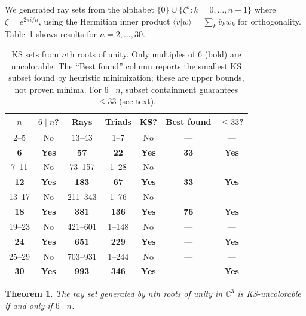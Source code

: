 \documentclass[12pt,a4paper]{article}
\newtheorem{theorem}{Theorem}
\newcommand{\C}{\mathbb{C}}
\newcommand{\braket}[2]{\langle#1|#2\rangle}
\begin{document}
We generated ray sets from the alphabet $\{0\} \cup \{\zeta^k : k = 0, \ldots, n-1\}$ where $\zeta = e^{2\pi i/n}$, using the Hermitian inner product $\braket{v}{w} = \sum_k \bar{v}_k w_k$ for orthogonality. Table~\ref{tab:roots} shows results for $n = 2, \ldots, 30$.

\begin{table}[ht]
\centering
\caption{KS sets from $n$th roots of unity. Only multiples of 6 (bold) are uncolorable. The ``Best found'' column reports the smallest KS subset found by heuristic minimization; these are upper bounds, not proven minima. For $6 \mid n$, subset containment guarantees $\leq 33$ (see text).}
\label{tab:roots}
\begin{tabular}{ccccccc}
\toprule
$n$ & $6 \mid n$? & Rays & Triads & KS? & Best found & $\leq 33$? \\
\midrule
2--5 & No & 13--43 & 1--7 & No & --- & --- \\
\textbf{6} & \textbf{Yes} & \textbf{57} & \textbf{22} & \textbf{Yes} & \textbf{33} & \textbf{Yes} \\
7--11 & No & 73--157 & 1--28 & No & --- & --- \\
\textbf{12} & \textbf{Yes} & \textbf{183} & \textbf{67} & \textbf{Yes} & \textbf{33} & \textbf{Yes} \\
13--17 & No & 211--343 & 1--76 & No & --- & --- \\
\textbf{18} & \textbf{Yes} & \textbf{381} & \textbf{136} & \textbf{Yes} & \textbf{76} & \textbf{Yes} \\
19--23 & No & 421--601 & 1--148 & No & --- & --- \\
\textbf{24} & \textbf{Yes} & \textbf{651} & \textbf{229} & \textbf{Yes} & --- & \textbf{Yes} \\
25--29 & No & 703--931 & 1--244 & No & --- & --- \\
\textbf{30} & \textbf{Yes} & \textbf{993} & \textbf{346} & \textbf{Yes} & --- & \textbf{Yes} \\
\bottomrule
\end{tabular}
\end{table}

\begin{theorem}\label{thm:6n}
The ray set generated by $n$th roots of unity in $\C^3$ is KS-uncolorable if and only if $6 \mid n$.
\end{theorem}
\end{document}
